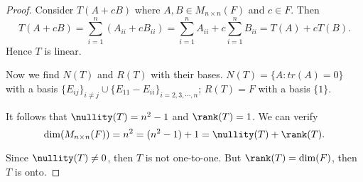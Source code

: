 \begin{Exercise}
\begin{proof}
Consider $T(A+c B)$ where $A,B\in M_{n\times n}(F)$ and $c\in F$.
Then
$$
T(A+c B) = \sum_{i=1}^{n} \left( A_{i i}+c B_{i i} \right)
= \sum_{i=1}^{n} A_{i i} + c\sum_{i=1}^{n} B_{i i}
= T(A) + c T(B).
$$
Hence $T$ is linear.

Now we find $N(T)$ and $R(T)$ with their bases. $N(T) = \{ A:tr(A) = 0\}$ with a basis $\{E_{i j}\}_{i\neq j}\cup \{E_{1 1} - E_{i i} \}_{i=2,3,\cdots,n}$;
$R(T) = F$ with a basis $\{1\}$.

It follows that $\nullity(T) = n^2-1$ and $\rank(T) = 1$. We can verify
$$
\dim(M_{n\times n}(F)) = n^2 = (n^2-1) + 1 =  \nullity(T)+\rank(T).
$$

Since $\nullity(T)\neq 0$, then $T$ is not one-to-one. But $\rank(T) = \dim(F)$, then $T$ is onto.
\end{proof}
\end{Exercise}